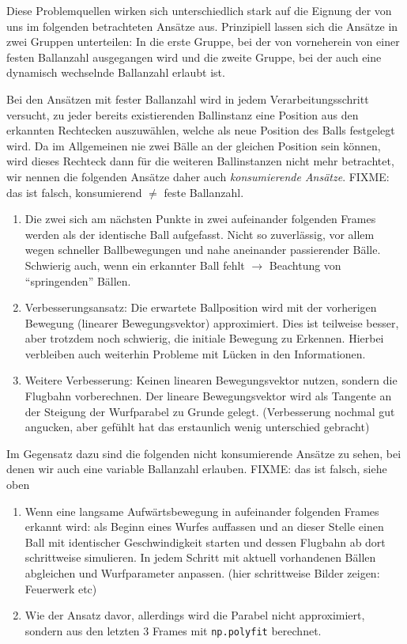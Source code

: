 \documentclass[12pt,a4paper,ngerman]{scrartcl}
\begin{document}
Diese Problemquellen wirken sich unterschiedlich stark auf die Eignung der von
uns im folgenden betrachteten Ansätze aus. Prinzipiell lassen sich die Ansätze
in zwei Gruppen unterteilen: In die erste Gruppe, bei der von vorneherein von einer
festen Ballanzahl ausgegangen wird und die zweite Gruppe, bei der auch eine dynamisch wechselnde Ballanzahl erlaubt ist.

Bei den Ansätzen mit fester Ballanzahl wird in jedem Verarbeitungsschritt versucht,
zu jeder bereits existierenden Ballinstanz eine Position aus den erkannten Rechtecken
auszuwählen, welche als neue Position des Balls festgelegt wird. Da im Allgemeinen nie
zwei Bälle an der gleichen Position sein können, wird dieses Rechteck dann für die weiteren Ballinstanzen nicht mehr betrachtet, wir nennen die folgenden Ansätze daher
auch \textit{konsumierende Ansätze}. FIXME: das ist falsch, konsumierend $\neq$ feste Ballanzahl.
 
 \begin{enumerate}
 \item Die zwei sich am nächsten Punkte in zwei aufeinander folgenden Frames werden als der identische Ball aufgefasst. Nicht so zuverlässig, vor allem wegen schneller Ballbewegungen und nahe aneinander passierender Bälle. Schwierig auch, wenn ein erkannter Ball fehlt $\rightarrow$ Beachtung von ``springenden'' Bällen.
 \item Verbesserungsansatz: Die erwartete Ballposition wird mit der vorherigen Bewegung (linearer Bewegungsvektor) approximiert. Dies ist teilweise besser, aber trotzdem noch schwierig, die initiale Bewegung zu Erkennen. Hierbei verbleiben auch weiterhin Probleme mit Lücken in den Informationen.
 \item Weitere Verbesserung: Keinen linearen Bewegungsvektor nutzen, sondern die Flugbahn vorberechnen. Der lineare Bewegungsvektor wird als Tangente an der Steigung der Wurfparabel zu Grunde gelegt. (Verbesserung nochmal gut angucken, aber gefühlt hat das erstaunlich wenig unterschied gebracht)
 \end{enumerate}
  
  
Im Gegensatz dazu sind die folgenden nicht konsumierende Ansätze zu sehen, bei denen
wir auch eine variable Ballanzahl erlauben. FIXME: das ist falsch, siehe oben
  
\begin{enumerate}
	\item Wenn eine langsame Aufwärtsbewegung in aufeinander folgenden Frames erkannt wird: als Beginn eines Wurfes auffassen und an dieser Stelle einen Ball mit identischer Geschwindigkeit starten und dessen Flugbahn ab dort schrittweise simulieren. In jedem Schritt mit aktuell vorhandenen Bällen abgleichen und Wurfparameter anpassen. (hier schrittweise Bilder zeigen: Feuerwerk etc)
	\item Wie der Ansatz davor, allerdings wird die Parabel nicht approximiert, sondern	aus den letzten 3 Frames mit \lstinline{np.polyfit} berechnet.
\end{enumerate}
\end{document}
